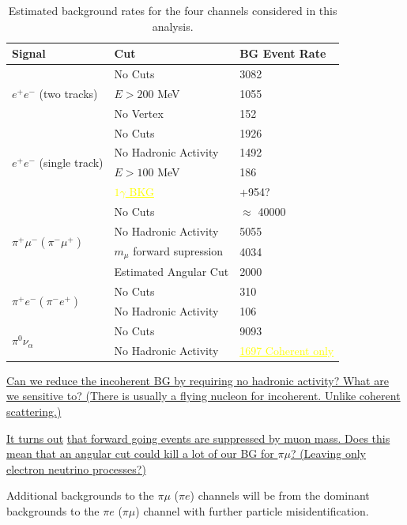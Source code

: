 \documentclass[11pt, a4paper]{article}
\newcommand{\newtext}[2]{\textcolor{#1}{\ul{#2}}}
\begin{document}
 \begin{table}[t]
\centering
\begin{tabular}{ l | l | l}
Signal & Cut & BG Event Rate \\
\hline\hline
 \multirow{3}{*}{$e^+ e^-$ (two tracks)} & No Cuts & 3082\\
 \cline{2-3}
 & $E>200$ MeV & 1055 \\
 \cline{2-3}
 & No Vertex & 152\\
\cline{1-3}
 \multirow{4}{*}{$e^+ e^-$ (single track)} & No Cuts& 1926\\
 \cline{2-3}
 & No Hadronic Activity & 1492 \\
 \cline{2-3}
 & $E>100$ MeV  & 186 \\
 \cline{2-3}
 & \newtext{MARK}{ $1 \gamma$ BKG  } & +954?\\
\cline{1-3}
 \multirow{4}{*}{$\pi^+\mu^-(\pi^-\mu^+)$} & No Cuts & $\approx$ 40000\\
 \cline{2-3}
 & No Hadronic Activity & 5055\\
 \cline{2-3}
 & $m_\mu$ forward supression & 4034\\
 \cline{2-3}
 & Estimated Angular Cut & 2000 \\
\cline{1-3}
 \multirow{2}{*}{$\pi^+e^-(\pi^-e^+)$} & No Cuts & 310\\
\cline{2-3}
 & No Hadronic Activity  & 106\\
\cline{1-3}
\multirow{2}{*}{$\pi^0 \nu_\alpha$} & No Cuts & 9093\\
\cline{2-3}
& No Hadronic Activity  & \newtext{MARK}{1697 Coherent only}\\

\end{tabular}
\caption{\label{tab:Rates} Estimated background rates for the four channels considered in this analysis. }
\end{table}



\newtext{PB}{Can we reduce the incoherent BG by requiring no hadronic activity? What are we sensitive to? (There is usually a flying nucleon for incoherent. Unlike coherent scattering.)}

\newtext{PB}{It turns out} \cite{Rein:2006di} \newtext{PB}{that forward going events are
suppressed by muon mass. Does this mean that an angular cut could kill a lot of
our BG for $\pi \mu$? (Leaving only electron neutrino processes?)}

Additional backgrounds to the $\pi \mu$ ($\pi e$) channels will be from the
dominant backgrounds to the $\pi e$ ($\pi \mu$) channel with further particle
misidentification.
\end{document}
